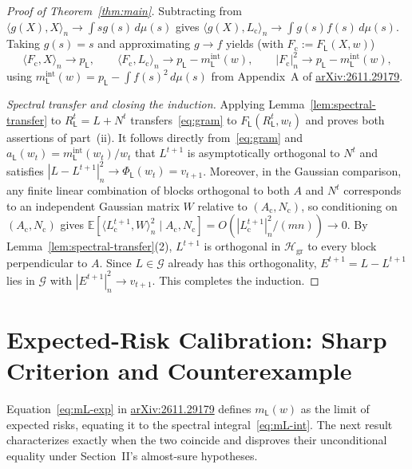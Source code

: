 \documentclass[11pt]{article}
\theoremstyle{plain}
\theoremstyle{definition}
\theoremstyle{remark}
\newcommand{\E}{\mathbb{E}}
\newcommand{\sL}{\mathsf{L}}
\begin{document}
\begin{proof}[Proof of Theorem~\ref{thm:main}]
Subtracting from $\langle g(X), X\rangle_n \to \int s g(s)\,d\mu(s)$ gives $\langle g(X), L_{\mathrm{c}}\rangle_n \to \int g(s)f(s)\,d\mu(s)$.
Taking $g(s) = s$ and approximating $g \to f$ yields (with $F_{\mathrm{c}} := F_{\sL}(X, w)$)
\begin{equation}\label{eq:gram}
\langle F_{\mathrm{c}}, X\rangle_n \to p_{\sL},
\qquad
\langle F_{\mathrm{c}}, L_{\mathrm{c}}\rangle_n \to p_{\sL} - m_{\sL}^{\mathrm{int}}(w),
\qquad
|F_{\mathrm{c}}|_n^2 \to p_{\sL} - m_{\sL}^{\mathrm{int}}(w),
\end{equation}
using $m_{\sL}^{\mathrm{int}}(w) = p_{\sL} - \int f(s)^2\,d\mu(s)$ from Appendix~A of \href{https://arxiv.org/abs/2611.29179}{arXiv:2611.29179}.

\emph{Spectral transfer and closing the induction.}
Applying Lemma~\ref{lem:spectral-transfer} to $R_{\sL}^t = L + N^t$ transfers~\eqref{eq:gram} to $F_{\sL}(R_{\sL}^t, w_t)$ and proves both assertions of part~(ii).
It follows directly from~\eqref{eq:gram} and $a_{\sL}(w_t) = m_{\sL}^{\mathrm{int}}(w_t)/w_t$ that $L^{t+1}$ is asymptotically orthogonal to $N^t$ and satisfies $|L - L^{t+1}|_n^2 \to \Phi_{\sL}(w_t) = v_{t+1}$.
Moreover, in the Gaussian comparison, any finite linear combination of blocks orthogonal to both $A$ and $N^t$ corresponds to an independent Gaussian matrix $W$ relative to $(A_{\mathrm{c}}, N_{\mathrm{c}})$, so conditioning on $(A_{\mathrm{c}}, N_{\mathrm{c}})$ gives $\E[\langle L_{\mathrm{c}}^{t+1}, W\rangle_n^2 \mid A_{\mathrm{c}}, N_{\mathrm{c}}] = O(|L_{\mathrm{c}}^{t+1}|_n^2/(mn)) \to 0$.
By Lemma~\ref{lem:spectral-transfer}(2), $L^{t+1}$ is orthogonal in $\mathcal{H}_{\mathrm{gr}}$ to every block perpendicular to $A$. Since $L \in \mathcal{G}$ already has this orthogonality, $E^{t+1} = L - L^{t+1}$ lies in $\mathcal{G}$ with $|E^{t+1}|_n^2 \to v_{t+1}$. This completes the induction.
\end{proof}

\section{Expected-Risk Calibration: Sharp Criterion and Counterexample}\label{sec:ui}

Equation~\eqref{eq:mL-exp} in \href{https://arxiv.org/abs/2611.29179}{arXiv:2611.29179} defines $m_{\sL}(w)$ as the limit of expected risks, equating it to the spectral integral~\eqref{eq:mL-int}. The next result characterizes exactly when the two coincide and disproves their unconditional equality under Section~II's almost-sure hypotheses.
\end{document}
